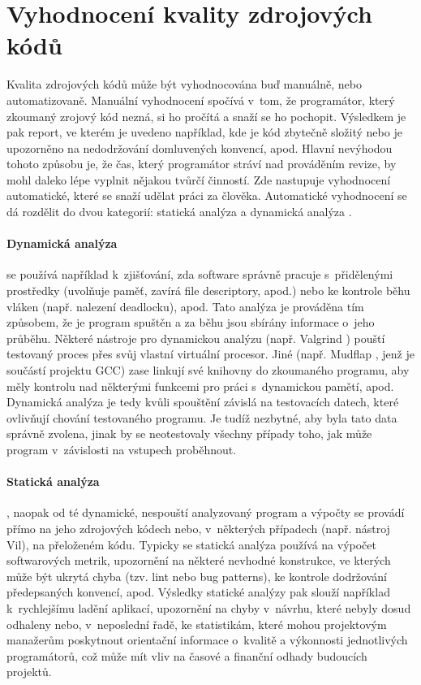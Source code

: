 \documentclass[11pt,twoside,a4paper]{book}
\begin{document}
\section{Vyhodnocení kvality zdrojových kódů}
\label{sec:KvalitaKodu}
Kvalita zdrojových kódů může být vyhodnocována buď manuálně, nebo automatizovaně. Manuální vyhodnocení spočívá v~tom,
že programátor, který zkoumaný zrojový kód nezná, si ho pročítá a snaží se ho pochopit. Výsledkem je pak report,
ve kterém je uvedeno například, kde je kód zbytečně složitý nebo je upozorněno na nedodržování domluvených konvencí, apod.
Hlavní nevýhodou tohoto způsobu je, že čas, který programátor stráví nad prováděním revize, by mohl daleko lépe vyplnit
nějakou tvůrčí činností. Zde nastupuje vyhodnocení automatické, které se snaží udělat práci za člověka.
Automatické vyhodnocení se dá rozdělit do dvou kategorií: statická analýza \cite{static_analysis} a dynamická analýza \cite{dynamic_analysis}.

\paragraph{Dynamická analýza} se používá například k~zjišťování, zda software správně pracuje s~přidělenými prostředky
(uvolňuje paměť, zavírá file descriptory, apod.) nebo ke kontrole běhu vláken (např. nalezení deadlocku), apod.
Tato analýza je prováděna tím způsobem, že je program spuštěn a za běhu jsou sbírány informace o~jeho průběhu.
Některé nástroje pro dynamickou analýzu (např. Valgrind \cite{Valgrind}) pouští testovaný proces přes svůj vlastní virtuální procesor.
Jiné (např. Mudflap \cite{Mudflap}, jenž je součástí projektu GCC) zase linkují své knihovny do zkoumaného programu,
aby měly kontrolu nad některými funkcemi pro práci s~\mbox{dynamickou} pamětí, apod. Dynamická analýza je tedy kvůli spouštění
závislá na testovacích datech, které ovlivňují chování testovaného programu. Je tudíž nezbytné, aby byla tato data správně zvolena,
jinak by se neotestovaly všechny případy toho, jak může program v~závislosti na vstupech proběhnout.

\paragraph{Statická analýza}, naopak od té dynamické, nespouští analyzovaný program a výpočty se provádí přímo na
jeho zdrojových kódech nebo, v~některých případech (např. nástroj Vil\cite{Vil}), na přeloženém kódu. Typicky se statická analýza
používá na výpočet softwarových metrik, upozornění na některé nevhodné konstrukce, ve kterých může být ukrytá
chyba (tzv. lint\cite{lint} nebo bug patterns\cite{bug_patterns}), ke kontrole dodržování předepsaných konvencí, apod.
Výsledky statické analýzy pak slouží například k~rychlejšímu ladění aplikací, upozornění na chyby v~návrhu, které
nebyly dosud odhaleny nebo, v~neposlední řadě, ke statistikám, které mohou projektovým manažerům poskytnout orientační
informace o~kvalitě a \mbox{výkonnosti} jednotlivých programátorů, což může mít vliv na časové a finanční odhady budoucích projektů.
\end{document}
